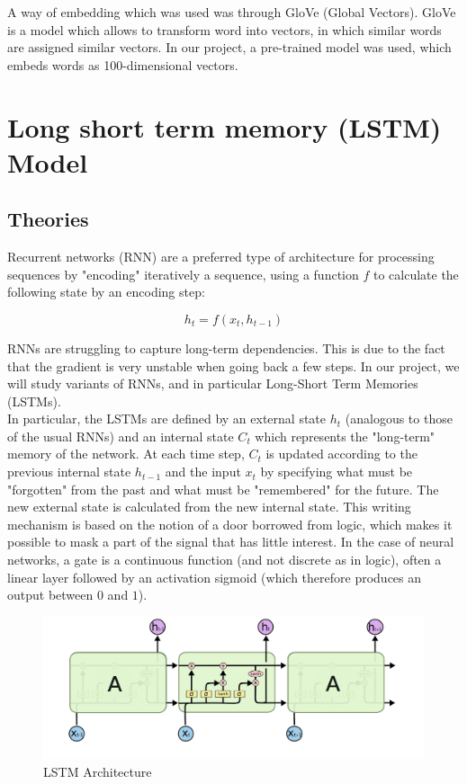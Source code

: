 \documentclass{article}
\begin{document}
A way of embedding which was used was through GloVe (Global Vectors). GloVe is a model which allows to transform word into vectors, in which similar words are assigned similar vectors. In our project, a pre-trained model was used, which embeds words as 100-dimensional vectors.

\section{Long short term memory (LSTM) Model}

\subsection{Theories}

Recurrent networks (RNN) are a preferred type of architecture for processing sequences by "encoding" iteratively a sequence, using a function $f$ to calculate the following state by
an encoding step: 

$$h_t = f (x_t, h_{t−1})$$

RNNs are struggling to capture long-term dependencies. This is due to the fact that the gradient is very unstable when going back a few steps.
In our project, we will study variants of RNNs, and in particular Long-Short Term Memories (LSTMs).\\

In particular, the LSTMs are defined by an external state $h_t$ (analogous to those of the usual RNNs) and an internal state $C_t$ which represents the "long-term" memory of the network. At each time step, $C_t$ is updated according to the previous internal state $h_{t − 1}$ and the input $x_t$ by specifying what must be "forgotten" from the past and what must be "remembered" for the future. The new external state is calculated from the new internal state. This writing mechanism is based on the notion of a door borrowed from logic, which makes it possible to mask a part of the signal that has little interest. In the case of neural networks, a gate is a continuous function (and not discrete as in logic), often a linear layer followed by an activation sigmoid (which therefore produces an output between $0$ and $1$).

\begin{figure}
  \includegraphics[width=\linewidth]{images/lstm_model.png}
  \caption{LSTM Architecture}
  \label{fig:boat1}
\end{figure}
\end{document}
